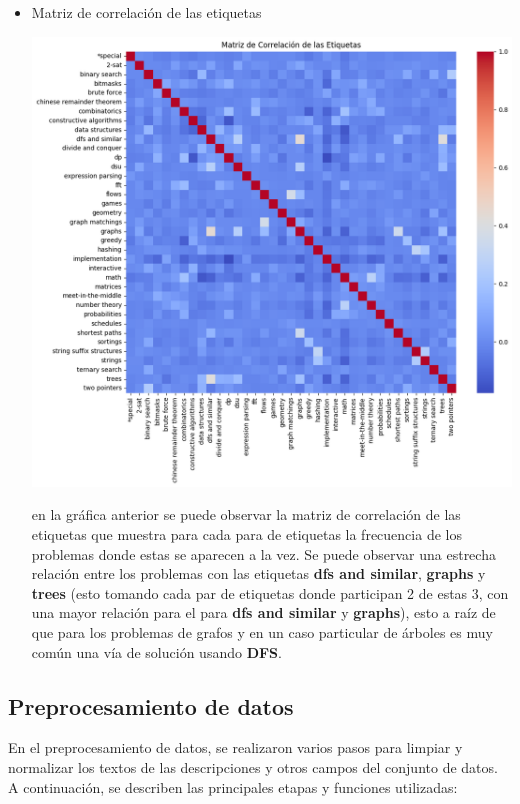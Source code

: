 \documentclass{article}
\begin{document}
\begin{itemize}
    \item Matriz de correlación de las etiquetas
          \begin{center}
              \includegraphics[scale=0.5]{imgs/correlation_matrix.png}
          \end{center}
          en la gráfica anterior se puede observar la matriz de correlación de las etiquetas que muestra para cada para de etiquetas la frecuencia
          de los problemas donde estas se aparecen a la vez. Se puede observar una estrecha relación entre los problemas con las etiquetas \textbf{dfs and similar}, \textbf{graphs} y \textbf{trees}
          (esto tomando cada par de etiquetas donde participan 2 de estas 3, con una mayor relación para el para \textbf{dfs and similar} y \textbf{graphs}), esto a raíz de que para los problemas de grafos
          y en un caso particular de árboles es muy común una vía de solución usando \textbf{DFS}.
          
\end{itemize}

\subsection{Preprocesamiento de datos}

En el preprocesamiento de datos, se realizaron varios pasos para 
limpiar y normalizar los textos de las descripciones y otros campos del 
conjunto de datos. A continuación, se describen las principales etapas 
y funciones utilizadas:
\end{document}
